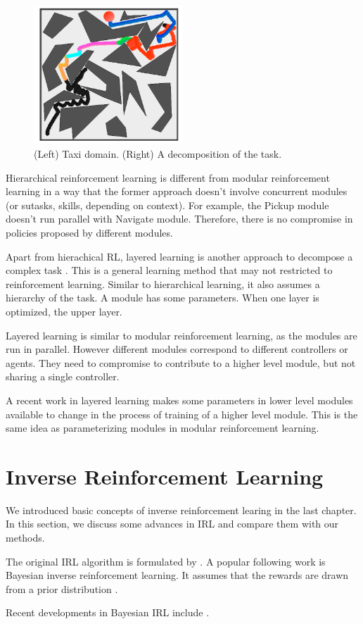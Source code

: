 \begin{figure}[h]
\centering
\includegraphics[width=0.5\textwidth]{skills}
\caption{(Left) Taxi domain. (Right) A decomposition of the task.}
\label{fig:skills}
\end{figure}

Hierarchical reinforcement learning is different from modular reinforcement
learning in a way that the former approach doesn't involve concurrent modules
(or sutasks, skills, depending on context).
For example, the Pickup module doesn't run parallel with Navigate module.
Therefore, there is no compromise in policies proposed by different modules.

Apart from hierachical RL, layered learning is another approach to decompose a
complex task \cite{stone2000layered}. This is a general learning method that may
not restricted to reinforcement learning. Similar to hierarchical learning, it
also assumes a hierarchy of the task. A module has some parameters. When one
layer is optimized, the upper layer.

Layered learning is similar to modular reinforcement learning, as the modules are
run in parallel. However different modules correspond to different controllers
or agents. They need to compromise to contribute to a higher level module, but
not sharing a single controller.

A recent work in layered learning makes some parameters in lower level modules
available to change in the process of training of a higher level module. This is
the same idea as parameterizing modules in modular reinforcement learning. 

\section{Inverse Reinforcement Learning}

We introduced basic concepts of inverse reinforcement learing in the last
chapter. In this section, we discuss some advances in IRL and compare them with
our methods.

The original IRL algorithm is formulated by
\cite{abbeel2004apprenticeship,ng2000algorithms}.  A popular following work is
Bayesian inverse reinforcement learning. It assumes that the rewards are drawn
from a prior distribution \cite{ramachandran2007bayesian}.

Recent developments in Bayesian
IRL include \cite{choi2011map,choi2012nonparametric,dimitrakakis2012bayesian}.

